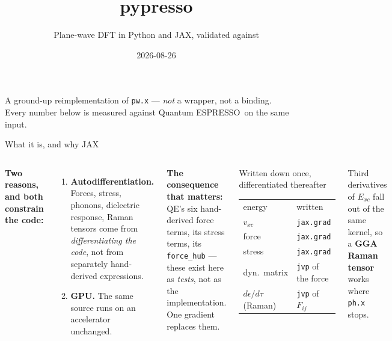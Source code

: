 \documentclass[aspectratio=169,10pt]{beamer}
\title{\textbf{pypresso}}
\subtitle{Plane-wave DFT in Python and JAX, validated against \qe}
\date{2026-08-26}
\newcommand{\qe}{Quantum ESPRESSO}
\begin{document}
\begin{frame}\titlepage
\begin{center}\small
A ground-up reimplementation of \texttt{pw.x} --- \emph{not} a wrapper, not a binding.\\
Every number below is measured against \qe\ on the same input.
\end{center}
\end{frame}

\begin{frame}{What it is, and why JAX}
\begin{columns}[T]
\textbf{Two reasons, and both constrain the code:}
\begin{enumerate}
  \item \textbf{Autodifferentiation.} Forces, stress, phonons, dielectric
    response, Raman tensors come from \emph{differentiating the code}, not from
    separately hand-derived expressions.
  \item \textbf{GPU.} The same source runs on an accelerator unchanged.
\end{enumerate}
\vspace{4pt}
\textbf{The consequence that matters:}\\
QE's six hand-derived force terms, its stress terms, its \texttt{force\_hub} ---
these exist here as \emph{tests}, not as the implementation. One gradient
replaces them.
\footnotesize
\begin{block}{Written down once, differentiated thereafter}
\begin{tabular}{ll}
\toprule
energy & written \\
$v_{xc}$ & \texttt{jax.grad} \\
force & \texttt{jax.grad} \\
stress & \texttt{jax.grad} \\
dyn.\ matrix & \texttt{jvp} of the force \\
$d\epsilon/d\tau$ (Raman) & \texttt{jvp} of $F_{ij}$ \\
\bottomrule
\end{tabular}
\end{block}
Third derivatives of $E_{xc}$ fall out of the same kernel, so a \textbf{GGA
Raman tensor} works where \texttt{ph.x} stops.
\end{columns}
\end{frame}
\end{document}

